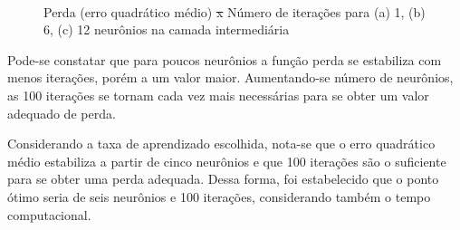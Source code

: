 \documentclass[brazil,tf,epusp]{usp}  %
\providecommand{\DIFadd}[1]{{\protect\color{blue}\uwave{#1}}} %
\providecommand{\DIFdel}[1]{{\protect\color{red}\sout{#1}}}                      %
\providecommand{\DIFaddFL}[1]{\DIFadd{#1}} %
\providecommand{\DIFdelFL}[1]{\DIFdel{#1}} %
\providecommand{\DIFaddbeginFL}{} %
\providecommand{\DIFaddendFL}{} %
\providecommand{\DIFdelbeginFL}{} %
\providecommand{\DIFdelendFL}{} %
\begin{document}
\begin{figure}[!h]
\hfill
{}\DIFaddbeginFL \\
\caption{Perda (erro quadrático médio) \DIFdelbeginFL \DIFdelFL{x }\DIFdelendFL \DIFaddbeginFL \DIFaddFL{vs. }\DIFaddendFL Número de iterações para (a) 1, (b) 6, (c) 12 neurônios na camada intermediária}
\label{fig:loss_NN}
\end{figure}

Pode-se constatar que para poucos neurônios a função perda se estabiliza com menos iterações, porém a um valor maior. Aumentando-se número de neurônios, as 100 iterações se tornam cada vez mais necessárias para se obter um valor adequado de perda.

Considerando a taxa de aprendizado escolhida, nota-se que o erro quadrático médio estabiliza a partir de cinco neurônios e que 100 iterações são o suficiente para se obter uma perda adequada. Dessa forma, foi estabelecido que o ponto ótimo seria de seis neurônios e 100 iterações, considerando também o tempo computacional.
\end{document}
